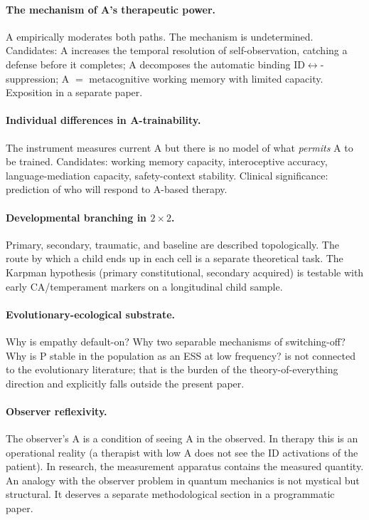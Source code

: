 \paragraph{The mechanism of A's therapeutic power.} A empirically moderates both paths. The mechanism is undetermined. Candidates: A increases the temporal resolution of self-observation, catching a defense before it completes; A decomposes the automatic binding ID$\leftrightarrow$\EAF{}-suppression; A $=$ metacognitive working memory with limited capacity. Exposition in a separate paper.

\paragraph{Individual differences in A-trainability.} The instrument measures current A but there is no model of what \emph{permits} A to be trained. Candidates: working memory capacity, interoceptive accuracy, language-mediation capacity, safety-context stability. Clinical significance: prediction of who will respond to A-based therapy.

\paragraph{Developmental branching in $2\times 2$.} Primary, secondary, traumatic, and baseline are described topologically. The route by which a child ends up in each cell is a separate theoretical task. The Karpman hypothesis (primary constitutional, secondary acquired) is testable with early CA/temperament markers on a longitudinal child sample.

\paragraph{Evolutionary-ecological substrate.} Why is empathy default-on? Why two separable mechanisms of switching-off? Why is P stable in the population as an ESS at low frequency? \DEIC{} is not connected to the evolutionary literature; that is the burden of the theory-of-everything direction and explicitly falls outside the present paper.

\paragraph{Observer reflexivity.} The observer's A is a condition of seeing A in the observed. In therapy this is an operational reality (a therapist with low A does not see the ID activations of the patient). In research, the measurement apparatus contains the measured quantity. An analogy with the observer problem in quantum mechanics is not mystical but structural. It deserves a separate methodological section in a programmatic paper.
